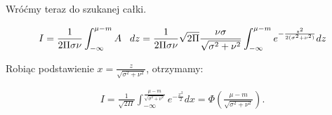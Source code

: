 \documentclass{mini}
\begin{document}
Wróćmy teraz do szukanej całki.

\begin{eqnarray*}
I = 
\frac{1}{2\Pi\sigma\nu} \int_{-\infty}^{\mu-m} A\hspace{3mm} dz
=
\frac{1}{2\Pi\sigma\nu} \sqrt{2\Pi}\frac{\nu\sigma}{\sqrt{\sigma^2+\nu^2}}  \int_{-\infty}^{\mu-m} e^{-\frac{z^2}{2(\sigma^2+\nu^2)}} dz
\end{eqnarray*}

Robiąc podstawienie $x = \frac{z}{\sqrt{\sigma^2+\nu^2}}$, otrzymamy:

\begin{eqnarray*}
I = 
\frac{1}{\sqrt{2\Pi}}\int_{-\infty}^{\frac{\mu-m}{\sqrt{\sigma^2+\nu^2}}} e^{-\frac{x^2}{2}} dx = \Phi \left(   \frac{\mu-m}{\sqrt{\sigma^2+\nu^2}}  \right).
\end{eqnarray*}

\end{document}

